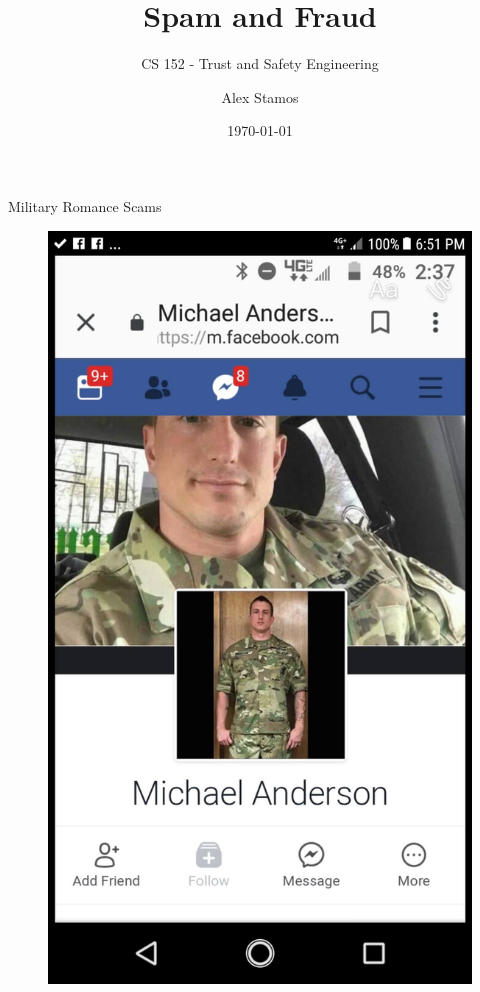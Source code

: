 \documentclass[nobackground,dvipsnames,table]{beamer}
\title{Spam and Fraud}
\subtitle{CS 152 - Trust and Safety Engineering}
\author[A. Stamos]{Alex Stamos}
\institute[Stanford University]{Stanford Cyber Policy Center}
\date[2022]{\today}
\begin{document}
\coverpage

\begin{frame}
    \titlepage
\end{frame}

\begin{frame}{Military Romance Scams}
    \begin{figure}
        \centering
        \includegraphics[height=0.85\textheight]{military-romance-scam}
    \end{figure}
\end{frame}
\end{document}
